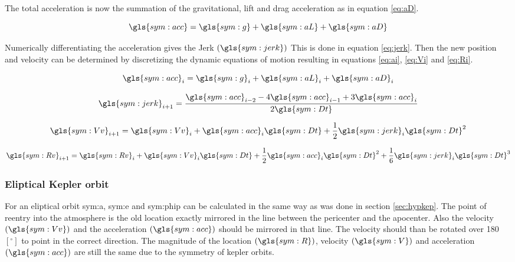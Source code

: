 The total acceleration is now the summation of the gravitational, lift and drag acceleration as in equation \ref{eq:aD}.

\begin{equation} \label{eq:acc}
\gls{sym:acc} = \gls{sym:g} + \gls{sym:aL} + \gls{sym:aD}
\end{equation}

Numerically differentiating the acceleration gives the Jerk $\left(\gls{sym:jerk}\right)$ This is done in equation \ref{eq:jerk}. Then the new position and velocity can be determined by discretizing the dynamic equations of motion resulting in equations \ref{eq:ai}, \ref{eq:Vi} and \ref{eq:Ri}.

\begin{equation} \label{eq:ai}
\gls{sym:acc}_i = \gls{sym:g}_i + \gls{sym:aL}_i + \gls{sym:aD}_i
\end{equation}

\begin{equation} \label{eq:jerk}
\gls{sym:jerk}_{i+1} = \frac{\gls{sym:acc}_{i-2} - 4\gls{sym:acc}_{i-1}+3\gls{sym:acc}_i}{2\gls{sym:Dt}}
\end{equation}

\begin{equation} \label{eq:Vi}
\gls{sym:Vv}_{i+1} = \gls{sym:Vv}_i + \gls{sym:acc}_i \gls{sym:Dt} + \frac{1}{2}\gls{sym:jerk}_i \gls{sym:Dt}^2
\end{equation}

\begin{equation} \label{eq:Ri}
\gls{sym:Rv}_{i+1} = \gls{sym:Rv}_i + \gls{sym:Vv}_i \gls{sym:Dt} + \frac{1}{2}\gls{sym:acc}_i \gls{sym:Dt}^2 + \frac{1}{6}\gls{sym:jerk}_i \gls{sym:Dt}^3
\end{equation}

\subsubsection{Eliptical Kepler orbit}
 \label{sec:eliptickep}
For an eliptical orbit \gls{sym:a}, \gls{sym:e} and \gls{sym:phip} can be calculated in the same way as was done in section \ref{sec:hypkep}. The point of reentry into the atmosphere is the old location exactly mirrored in the line between the pericenter and the apocenter. Also the velocity $\left(\gls{sym:Vv}\right)$ and the acceleration $\left(\gls{sym:acc}\right)$  should be mirrored in that line. The velocity should than be rotated over 180 $\left[^\circ\right]$ to point in the correct direction. The magnitude of the location $\left(\gls{sym:R}\right)$, velocity $\left(\gls{sym:V}\right)$ and acceleration $\left(\gls{sym:acc}\right)$ are still the same due to the symmetry of kepler orbits.

